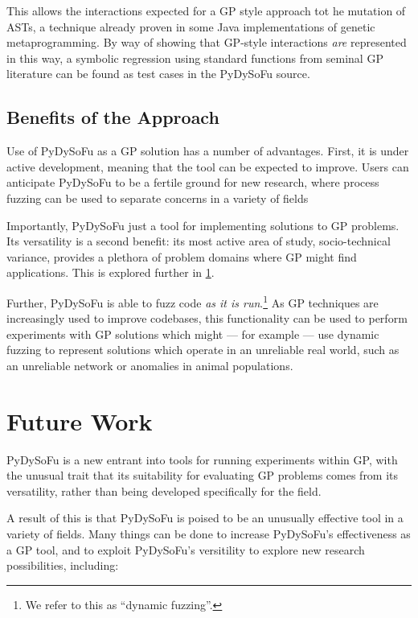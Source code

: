 \documentclass[draft,12pt]{llncs}   %
\begin{document}
This allows the interactions expected for a GP style approach tot he mutation of
ASTs, a technique already proven in some Java implementations of genetic
metaprogramming\cite{castle2012evolving,cody2015locogp}. By way of showing that
GP-style interactions \emph{are} represented in this way, a symbolic regression
using standard functions from seminal GP literature\cite{koza1994genetic} can be
found as test cases in the PyDySoFu source\cite{pydysofu}.\par

\subsection{Benefits of the Approach}
Use of PyDySoFu as a GP solution has a number of advantages. First, it is under
active development, meaning that the tool can be expected to improve. Users can
anticipate PyDySoFu to be a fertile ground for new research, where process
fuzzing can be used to separate concerns in a variety of fields\par

Importantly, PyDySoFu just a tool for implementing solutions to GP problems. Its
versatility is a second benefit: its most active area of study, socio-technical
variance, provides a plethora of problem domains where GP might find
applications. This is explored further in \cref{sec:future_work}.\par

Further, PyDySoFu is able to fuzz code \emph{as it is run}.\footnote{We refer to
this as ``dynamic fuzzing''.} As GP
techniques are increasingly used to improve codebases, this functionality can be
used to perform experiments with GP solutions which might --- for example ---
use dynamic fuzzing to represent solutions which operate in an unreliable real
world, such as an unreliable network or anomalies in animal populations.\par

\section{Future Work}
\label{sec:future_work}

PyDySoFu is a new entrant into tools for running experiments within GP, with the
unusual trait that its suitability for evaluating GP problems comes from its
versatility, rather than being developed specifically for the field.\par

A result of this is that PyDySoFu is poised to be an unusually effective tool in
a variety of fields. Many things can be done to increase PyDySoFu's
effectiveness as a GP tool, and to exploit PyDySoFu's versitility to explore new
research possibilities, including:
\end{document}
